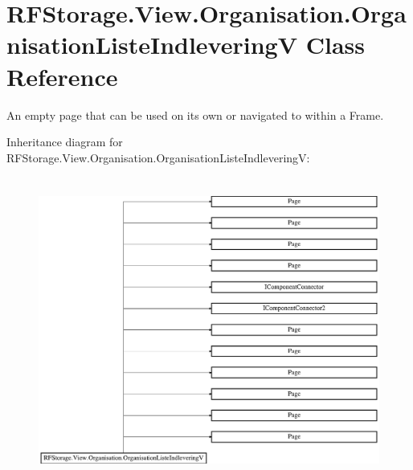 \hypertarget{class_r_f_storage_1_1_view_1_1_organisation_1_1_organisation_liste_indlevering_v}{}\section{R\+F\+Storage.\+View.\+Organisation.\+Organisation\+Liste\+IndleveringV Class Reference}
\label{class_r_f_storage_1_1_view_1_1_organisation_1_1_organisation_liste_indlevering_v}


An empty page that can be used on its own or navigated to within a Frame.  


Inheritance diagram for R\+F\+Storage.\+View.\+Organisation.\+Organisation\+Liste\+IndleveringV\+:\begin{figure}[H]
\begin{center}
\leavevmode
\includegraphics[height=10.055248cm]{class_r_f_storage_1_1_view_1_1_organisation_1_1_organisation_liste_indlevering_v}
\end{center}
\end{figure}
